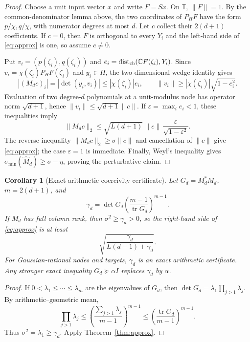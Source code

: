 \documentclass[11pt]{article}
\newtheorem{corollary}[theorem]{Corollary}
\theoremstyle{definition}\newtheorem{definition}[theorem]{Definition}\newtheorem{example}[theorem]{Example}
\theoremstyle{remark}\newtheorem{remark}[theorem]{Remark}\newtheorem{limitation}[theorem]{Limitation}
\newcommand{\C}{\mathbb C}\newcommand{\D}{\mathbb D}\newcommand{\T}{\mathbb T}
\newcommand{\norm}[1]{\lVert#1\rVert}\newcommand{\dd}{\,\mathrm d}
\begin{document}
\begin{proof}
Choose a unit input vector $x$ and write $F=Sx$.  On $\T$, $\norm{F}=1$.
By the common-denominator lemma above, the two coordinates of $P_HF$ have the form
$p/\chi,q/\chi$, with numerator degrees at most $d$.  Let $c$ collect their
$2(d+1)$ coefficients.  If $c=0$, then $F$ is orthogonal to every $Y_i$ and
the left-hand side of \eqref{eq:approx} is one, so assume $c\ne0$.

Put $v_i=(p(\zeta_i),q(\zeta_i))$ and
$e_i=\operatorname{dist}_{\rm ch}(\C F(\zeta_i),Y_i)$.  Since
$v_i=\chi(\zeta_i)P_HF(\zeta_i)$ and $y_i\in H$, the two-dimensional wedge
identity gives
\[
 |(M_dc)_i|=|\det(y_i,v_i)|\le |\chi(\zeta_i)|e_i,
 \qquad
 \norm{v_i}\ge |\chi(\zeta_i)|\sqrt{1-e_i^2}.
\]
Evaluation of two degree-$d$ polynomials at a unit-modulus node has operator
norm $\sqrt{d+1}$, hence $\norm{v_i}\le\sqrt{d+1}\norm c$.  If
$\varepsilon=\max_i e_i<1$, these inequalities imply
\[
 \norm{M_dc}_2
 \le \sqrt{L(d+1)}\,\norm c\,
       \frac{\varepsilon}{\sqrt{1-\varepsilon^2}}.
\]
The reverse inequality $\norm{M_dc}_2\ge\sigma\norm c$ and cancellation of
$\norm c$ give \eqref{eq:approx}; the case $\varepsilon=1$ is immediate.
Finally, Weyl's inequality gives
$\sigma_{\min}(\widehat M_d)\ge\sigma-\eta$, proving the perturbative claim.
\end{proof}

\begin{corollary}[Exact-arithmetic coercivity certificate]\label{cor:coercive}
Let $G_d=M_d^*M_d$, $m=2(d+1)$, and
\[
 \gamma_d=\det G_d\left(\frac{m-1}{\operatorname{tr}G_d}\right)^{m-1}.
\]
If $M_d$ has full column rank, then $\sigma^2\ge\gamma_d>0$, so the right-hand
side of \eqref{eq:approx} is at least
\[
                       \sqrt{\frac{\gamma_d}{L(d+1)+\gamma_d}}.
\]
For Gaussian-rational nodes and targets, $\gamma_d$ is an exact arithmetic
certificate.  Any stronger exact inequality $G_d\succeq\alpha I$ replaces
$\gamma_d$ by $\alpha$.
\end{corollary}

\begin{proof}
If $0<\lambda_1\le\cdots\le\lambda_m$ are the eigenvalues of $G_d$, then
$\det G_d=\lambda_1\prod_{j>1}\lambda_j$.  By arithmetic--geometric mean,
\[
 \prod_{j>1}\lambda_j
 \le\left(\frac{\sum_{j>1}\lambda_j}{m-1}\right)^{m-1}
 \le\left(\frac{\operatorname{tr}G_d}{m-1}\right)^{m-1}.
\]
Thus
$\sigma^2=\lambda_1\ge\gamma_d$.  Apply Theorem~\ref{thm:approx}.
\end{proof}
\end{document}
